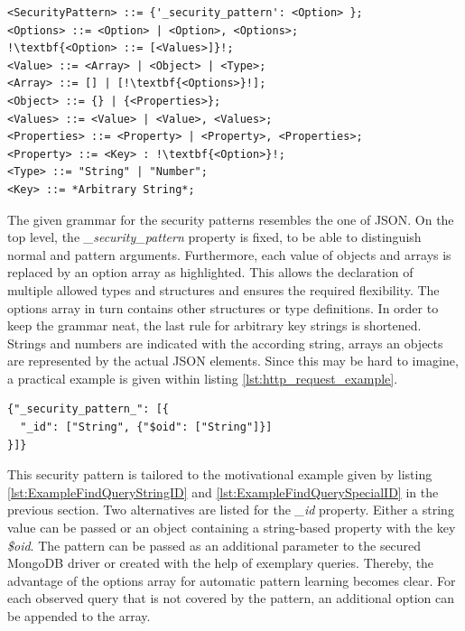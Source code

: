 \begin{lstlisting}[escapechar=!, caption={Proposed security pattern grammar for the injection mitigation mechanism}, label={lst:http_request_example}]
<SecurityPattern> ::= {'_security_pattern': <Option> };
<Options> ::= <Option> | <Option>, <Options>;
!\textbf{<Option> ::= [<Values>]}!;
<Value> ::= <Array> | <Object> | <Type>;
<Array> ::= [] | [!\textbf{<Options>}!];
<Object> ::= {} | {<Properties>};
<Values> ::= <Value> | <Value>, <Values>;
<Properties> ::= <Property> | <Property>, <Properties>;
<Property> ::= <Key> : !\textbf{<Option>}!;
<Type> ::= "String" | "Number";
<Key> ::= *Arbitrary String*;
\end{lstlisting}

The given grammar for the security patterns resembles the one of JSON. On the top level, the \emph{\_security\_pattern} property is fixed, to be able to distinguish normal and pattern arguments. Furthermore, each value of objects and arrays is replaced by an option array as highlighted. This allows the declaration of multiple allowed types and structures and ensures the required flexibility. The options array in turn contains other structures or type definitions. In order to keep the grammar neat, the last rule for arbitrary key strings is shortened. Strings and numbers are indicated with the according string, arrays an objects are represented by the actual JSON elements. Since this may be hard to imagine, a practical example is given within listing \ref{lst:http_request_example}. \\

\begin{lstlisting}[escapechar=!, caption={Security pattern allowing string-based and object-based identifiers as a query parameter}, label={lst:http_request_example}]
{"_security_pattern_": [{
  "_id": ["String", {"$oid": ["String"]}]
}]}
\end{lstlisting}

This security pattern is tailored to the motivational example given by listing \ref{lst:ExampleFindQueryStringID} and \ref{lst:ExampleFindQuerySpecialID} in the previous section. Two alternatives are listed for the \emph{\_id} property. Either a string value can be passed or an object containing a string-based property with the key \emph{\$oid}. The pattern can be passed as an additional parameter to the secured MongoDB driver or created with the help of exemplary queries. Thereby, the advantage of the options array for automatic pattern learning becomes clear. For each observed query that is not covered by the pattern, an additional option can be appended to the array. \\

